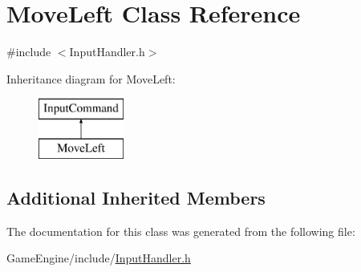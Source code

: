 \hypertarget{class_move_left}{}\section{Move\+Left Class Reference}
\label{class_move_left}


{\ttfamily \#include $<$Input\+Handler.\+h$>$}

Inheritance diagram for Move\+Left\+:\begin{figure}[H]
\begin{center}
\leavevmode
\includegraphics[height=2.000000cm]{class_move_left}
\end{center}
\end{figure}
\subsection*{Additional Inherited Members}


The documentation for this class was generated from the following file\+:\begin{DoxyCompactItemize}
\item 
Game\+Engine/include/\mbox{\hyperlink{_input_handler_8h}{Input\+Handler.\+h}}\end{DoxyCompactItemize}
